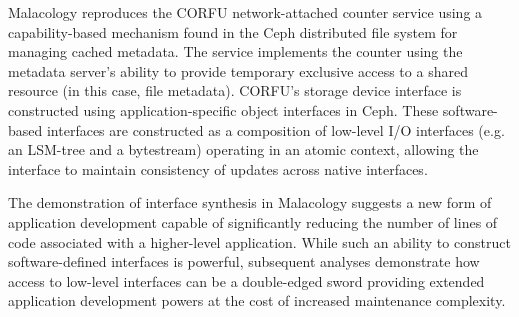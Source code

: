 Malacology reproduces the CORFU network-attached counter service using a
capability-based mechanism found in the Ceph distributed file system for
managing cached metadata. The service implements the counter using the metadata server's ability to provide temporary
exclusive access to a shared resource (in this case, file metadata). CORFU's storage device interface is
constructed using application-specific object interfaces in Ceph. These
software-based interfaces are constructed as a composition of low-level I/O
interfaces (e.g. an LSM-tree and a bytestream) operating in an atomic
context, allowing the interface to maintain consistency of updates across native
interfaces.

The demonstration of interface synthesis in Malacology suggests a new form of
application development capable of significantly reducing the number of lines of code associated with a higher-level application.
While such an ability to construct software-defined interfaces is powerful,
subsequent analyses demonstrate how access to low-level interfaces can be a double-edged
sword providing extended application development powers at the cost of increased maintenance complexity.
